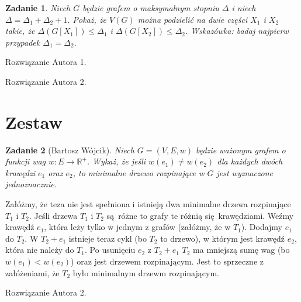 \documentclass{mwart}
\newcommand{\R}{\mathbb{R}}
\newtheorem{zad}{Zadanie}[section]
\begin{document}
\begin{zad}
    Niech $G$ będzie grafem o maksymalnym stopniu $\Delta$ i niech $\Delta = \Delta_1 + \Delta_2 +1$.
    Pokaż, że $V(G)$ można podzielić na dwie części $X_1$ i $X_2$ takie, że $\Delta (G[X_1]) \leq \Delta_1$ i $\Delta (G[X_2]) \leq \Delta_2$.
    Wskazówka: badaj najpierw przypadek $\Delta_1 = \Delta_2$.
\end{zad}
\begin{mdframed}
    Rozwiązanie Autora 1.
\end{mdframed}
\begin{mdframed}
    Rozwiązanie Autora 2.
\end{mdframed}












\section{Zestaw}          %
\begin{zad} [Bartosz Wójcik]
    Niech $G = (V, E, w)$ będzie ważonym grafem o funkcji wag $w: E \rightarrow \R^+$.
    Wykaż, że jeśli $w(e_1) \neq w(e_2)$ dla każdych dwóch krawędzi $e_1$ oraz $e_2$, to 
    minimalne drzewo rozpinające w $G$ jest wyznaczone jednoznacznie.
\end{zad}
\begin{mdframed}
    Załóżmy, że teza nie jest spełniona i istnieją dwa minimalne drzewa rozpinające $T_1$ i 
    $T_2$. Jeśli drzewa $T_1$ i $T_2$ są różne to grafy te różnią się krawędziami. Weźmy krawędź 
    $e_1$, która leży tylko w jednym z grafów (załóżmy, że w $T_1$). Dodajmy $e_1$ do $T_2$. W $T_2 + e_1$ 
     istnieje teraz cykl (bo $T_2$ to drzewo), w którym jest krawędź $e_2$, która nie należy do $T_1$. Po usunięciu 
     $e_2$ z $T_2 + e_1$ $T_2$ ma mniejszą sumę wag (bo $w(e_1) < w(e_2)$) oraz jest drzewem rozpinającym. Jest to sprzeczne 
     z załóżeniami, że $T_2$ było minimalnym drzewm rozpinającym.
\end{mdframed}
\begin{mdframed}
    Rozwiązanie Autora 2.
\end{mdframed}
\end{document}
